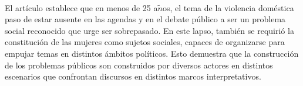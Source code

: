 \documentclass[10pt,spanish,letterpaper]{article}
\theoremstyle{plain}
\begin{document}
\\
El art\'iculo establece que en menos de 25 a$\tilde{n}$os, el tema de la violencia dom\'estica paso de estar ausente en las agendas y en el debate p\'ublico a ser un problema social reconocido que urge ser sobrepasado. En este lapso, tambi\'en se requiri\'o la constituci\'on de las mujeres como sujetos sociales, capaces de organizarse para empujar temas en distintos \'ambitos pol\'iticos. Esto demuestra que la construcci\'on de los problemas p\'ublicos son construidos por diversos actores en distintos escenarios que confrontan discursos en distintos marcos interpretativos.


\end{document}

